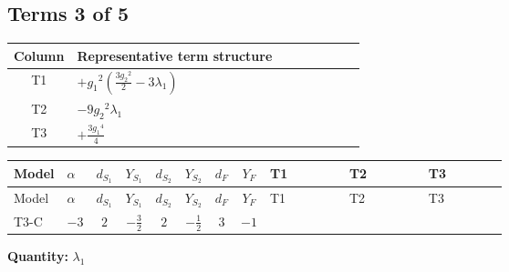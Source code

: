 \documentclass[8pt]{article}
\begin{document}
\begin{landscape}
\subsection*{Terms 3 of 5}
\begin{center}
\begin{tabular}{@{}c >{\raggedright\arraybackslash}p{0.82\linewidth}@{}}
\toprule
Column & Representative term structure \\
\midrule
T1 & \(\displaystyle +{g_1}^2 \left(\frac{3 {g_2}^2}{2}-3 {\lambda_1}\right)\) \\
\midrule
T2 & \(\displaystyle -9 {g_2}^2 {\lambda_1}\) \\
\midrule
T3 & \(\displaystyle +\frac{3 {g_1}^4}{4}\) \\
\midrule
\bottomrule
\end{tabular}
\end{center}
\smallskip
\tiny
\begin{longtable}{@{}llcccccc >{\raggedright\arraybackslash}p{0.21\linewidth} >{\raggedright\arraybackslash}p{0.21\linewidth} >{\raggedright\arraybackslash}p{0.21\linewidth}@{}}
\toprule
Model & $\alpha$ & $d_{S_1}$ & $Y_{S_1}$ & $d_{S_2}$ & $Y_{S_2}$ & $d_F$ & $Y_F$ & T1 & T2 & T3 \\
\midrule
\endfirsthead
\toprule
Model & $\alpha$ & $d_{S_1}$ & $Y_{S_1}$ & $d_{S_2}$ & $Y_{S_2}$ & $d_F$ & $Y_F$ & T1 & T2 & T3 \\
\midrule
\endhead
T3-C & $-3$ & $2$ & $-\frac{3}{2}$ & $2$ & $-\frac{1}{2}$ & $3$ & $-1$ & \scriptsize\adjustbox{max width=\linewidth}{$\begin{gathered} +{g_1}^2 \left(\frac{3 {g_2}^2}{2}-3 {\lambda_1}\right)\end{gathered}$} & \scriptsize\adjustbox{max width=\linewidth}{$\begin{gathered} -9 {g_2}^2 {\lambda_1}\end{gathered}$} & \scriptsize\adjustbox{max width=\linewidth}{$\begin{gathered} +\frac{3 {g_1}^4}{4}\end{gathered}$} \\
\midrule
\bottomrule
\end{longtable}
\clearpage
\noindent\textbf{Quantity: }$\lambda_1$\par\smallskip

\end{landscape}
\end{document}
